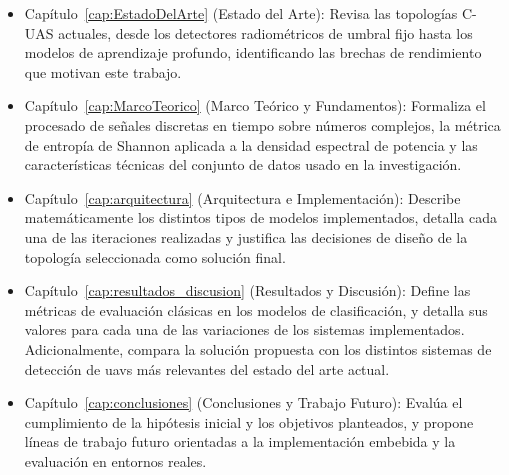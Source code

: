 \begin{itemize}
 \item Capítulo~\ref{cap:EstadoDelArte} (Estado del Arte): Revisa las topologías C-UAS actuales, desde los detectores radiométricos de umbral fijo hasta los modelos de aprendizaje profundo, identificando las brechas de rendimiento que motivan este trabajo.

 \item Capítulo~\ref{cap:MarcoTeorico} (Marco Teórico y Fundamentos): Formaliza el procesado de señales discretas en tiempo sobre números complejos, la métrica de entropía de Shannon aplicada a la densidad espectral de potencia y las características técnicas del conjunto de datos usado en la investigación.

 \item Capítulo~\ref{cap:arquitectura} (Arquitectura e Implementación): Describe matemáticamente los distintos tipos de modelos implementados, detalla cada una de las iteraciones realizadas y justifica las decisiones de diseño de la topología seleccionada como solución final.

 \item Capítulo~\ref{cap:resultados_discusion} (Resultados y Discusión): Define las métricas de evaluación clásicas en los modelos de clasificación, y detalla sus valores para cada una de las variaciones de los sistemas implementados. Adicionalmente, compara la solución propuesta con los distintos sistemas de detección de \glspl{uav} más relevantes del estado del arte actual.

 \item Capítulo~\ref{cap:conclusiones} (Conclusiones y Trabajo Futuro): Evalúa el cumplimiento de la hipótesis inicial y los objetivos planteados, y propone líneas de trabajo futuro orientadas a la implementación embebida y la evaluación en entornos reales.
\end{itemize}